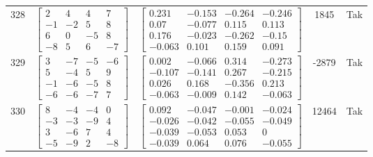 \documentclass[a4paper,12pt]{article}
\begin{document}
\begin{tabular}{c c c c c}
328
&
$\begin{bmatrix} 2 & 4 & 4 & 7 \\ -1 & -2 & 5 & 8 \\ 6 & 0 & -5 & 8 \\ -8 & 5 & 6 & -7 \end{bmatrix}$
&
$\begin{bmatrix} 0.231 & -0.153 & -0.264 & -0.246 \\ 0.07 & -0.077 & 0.115 & 0.113 \\ 0.176 & -0.023 & -0.262 & -0.15 \\ -0.063 & 0.101 & 0.159 & 0.091 \end{bmatrix}$
&
1845
&
Tak
\\
329
&
$\begin{bmatrix} 3 & -7 & -5 & -6 \\ 5 & -4 & 5 & 9 \\ -1 & -6 & -5 & 8 \\ -6 & -6 & -7 & 7 \end{bmatrix}$
&
$\begin{bmatrix} 0.002 & -0.066 & 0.314 & -0.273 \\ -0.107 & -0.141 & 0.267 & -0.215 \\ 0.026 & 0.168 & -0.356 & 0.213 \\ -0.063 & -0.009 & 0.142 & -0.063 \end{bmatrix}$
&
-2879
&
Tak
\\
330
&
$\begin{bmatrix} 8 & -4 & -4 & 0 \\ -3 & -3 & -9 & 4 \\ 3 & -6 & 7 & 4 \\ -5 & -9 & 2 & -8 \end{bmatrix}$
&
$\begin{bmatrix} 0.092 & -0.047 & -0.001 & -0.024 \\ -0.026 & -0.042 & -0.055 & -0.049 \\ -0.039 & -0.053 & 0.053 & 0 \\ -0.039 & 0.064 & 0.076 & -0.055 \end{bmatrix}$
&
12464
&
Tak
\\
\end{tabular} \egroup \newpage
\end{document}

